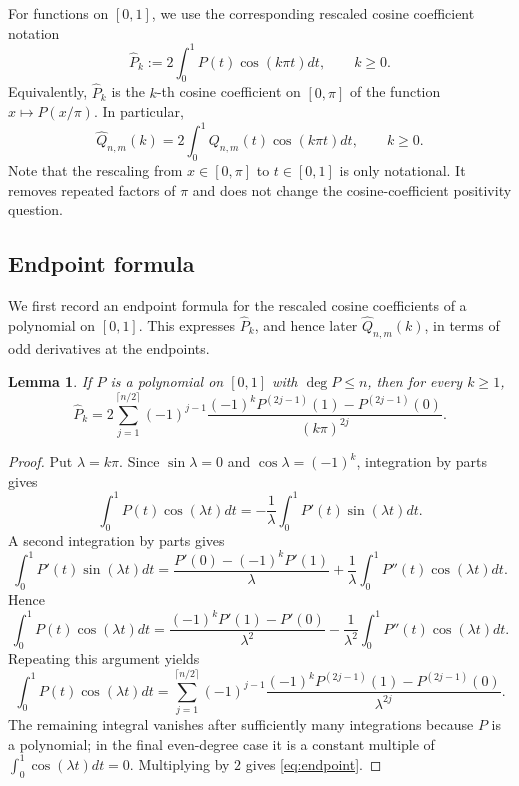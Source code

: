 \documentclass[10pt,a4paper]{amsart}
\newtheorem{lemma}[theorem]{Lemma}
\begin{document}
For functions on $[0,1]$, we use the corresponding rescaled cosine coefficient notation 
\[ 
\widehat P_k := 2\int_0^1 P(t)\cos(k\pi t) dt,  \qquad k\ge 0. 
\] 
Equivalently, $\widehat P_k$ is the $k$-th cosine coefficient on $[0,\pi]$ of the function $x\mapsto P(x/\pi)$. In particular, 
\[
\widehat Q_{n,m}(k) = 2\int_0^1 Q_{n,m}(t)\cos(k\pi t) dt, \qquad k\ge 0. 
\]
Note that the rescaling from $x\in[0,\pi]$ to $t\in[0,1]$ is only notational. It removes repeated factors of $\pi$ and does not change the cosine-coefficient positivity question.

\subsection{Endpoint formula}

We first record an endpoint formula for the rescaled cosine coefficients of a polynomial on $[0,1]$. This expresses $\widehat P_k$, and hence later $\widehat Q_{n,m}(k)$, in terms of odd derivatives at the endpoints.

\begin{lemma}\label{lem:endpoint}
If $P$ is a polynomial on $[0,1]$ with $\deg P\le n$, then for every $k\ge1$,
\begin{equation}
\label{eq:endpoint}
\widehat P_k
=2\sum_{j=1}^{\lceil n/2\rceil}(-1)^{j-1}
\frac{(-1)^kP^{(2j-1)}(1)-P^{(2j-1)}(0)}{(k\pi)^{2j}}.
\end{equation}
\end{lemma}

\begin{proof}
Put $\lambda=k\pi$. Since $\sin\lambda=0$ and $\cos\lambda=(-1)^k$, integration by parts gives
\[ 
\int_0^1 P(t)\cos(\lambda t) dt 
= -\frac1\lambda\int_0^1 P'(t)\sin(\lambda t) dt. 
\]
A second integration by parts gives
\[ 
\int_0^1 P'(t) \sin(\lambda t) dt = \frac{P'(0)-(-1)^kP'(1)}{\lambda} + \frac1\lambda\int_0^1 P''(t)\cos(\lambda t) dt. 
\]
Hence 
\[ 
\int_0^1 P(t)\cos(\lambda t) dt = \frac{(-1)^kP'(1)-P'(0)}{\lambda^2} -\frac1{\lambda^2}\int_0^1 P''(t)\cos(\lambda t) dt. 
\]
Repeating this argument yields
\[ 
\int_0^1 P(t)\cos(\lambda t) dt = \sum_{j=1}^{\lceil n/2\rceil}(-1)^{j-1} \frac{(-1)^kP^{(2j-1)}(1)-P^{(2j-1)}(0)}{\lambda^{2j}}. 
\]
The remaining integral vanishes after sufficiently many integrations because $P$ is a polynomial; in the final even-degree case it is a constant multiple of $\int_0^1 \cos(\lambda t) dt = 0$. Multiplying by $2$ gives \eqref{eq:endpoint}.
\end{proof}
\end{document}

